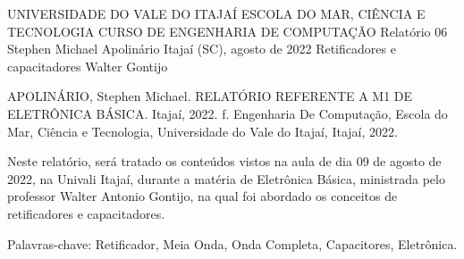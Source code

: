 
\begin{Info}
    {UNIVERSIDADE DO VALE DO ITAJAÍ}
    {ESCOLA DO MAR, CIÊNCIA E TECNOLOGIA}
    {CURSO DE ENGENHARIA DE COMPUTAÇÃO}
    {Relatório 06}
    {Stephen Michael Apolinário}
    {Itajaí (SC), agosto de 2022}
    {Retificadores e capacitadores}
    {Walter Gontijo}
    {}
    \end{Info}
    
    
    
    
    \begin{Resumo}
    
    APOLINÁRIO, Stephen Michael. RELATÓRIO REFERENTE A M1 DE ELETRÔNICA BÁSICA. Itajaí, 2022. \pageref{LastPage} f. Engenharia De Computação, Escola do Mar, Ciência e Tecnologia, Universidade do Vale do Itajaí, Itajaí, 2022.
    
    Neste relatório, será tratado os conteúdos vistos na aula de dia 09 de agosto de 2022, na Univali Itajaí, durante a matéria de Eletrônica Básica, ministrada pelo professor Walter Antonio Gontijo, na qual foi abordado os conceitos de retificadores e capacitadores.
    
    Palavras-chave: Retificador, Meia Onda, Onda Completa, Capacitores, Eletrônica.
    
    \end{Resumo}